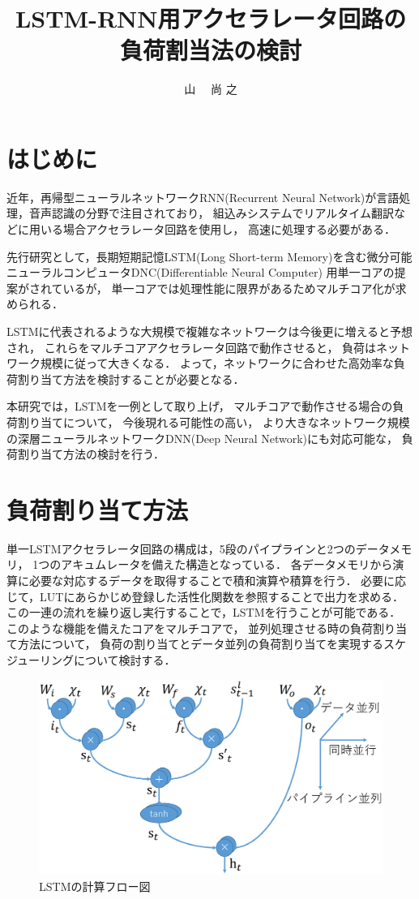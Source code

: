 \documentclass[a4j]{jarticle}
\title{LSTM-RNN用アクセラレータ回路の負荷割当法の検討}
\author{山 \UTF{FA11} ~~尚 之}
\begin{document}
\begin{Abstract}

 \section{はじめに}

近年，再帰型ニューラルネットワークRNN(Recurrent Neural Network)が言語処理，音声認識の分野で注目されており，
組込みシステムでリアルタイム翻訳などに用いる場合アクセラレータ回路を使用し，
高速に処理する必要がある．

先行研究として，長期短期記憶LSTM(Long Short-term Memory)を含む微分可能ニューラルコンピュータDNC(Differentiable Neural Computer)
用単一コアの提案\cite{bib:pre-method}がされているが，
単一コアでは処理性能に限界があるためマルチコア化が求められる．

LSTMに代表されるような大規模で複雑なネットワークは今後更に増えると予想され，
これらをマルチコアアクセラレータ回路で動作させると，
負荷はネットワーク規模に従って大きくなる．
よって，ネットワークに合わせた高効率な負荷割り当て方法を検討することが必要となる．

本研究では，LSTMを一例として取り上げ，
マルチコアで動作させる場合の負荷割り当てについて，
今後現れる可能性の高い，
より大きなネットワーク規模の深層ニューラルネットワークDNN(Deep Neural Network)にも対応可能な，
負荷割り当て方法の検討を行う．


 \section{負荷割り当て方法}
単一LSTMアクセラレータ回路の構成は，5段のパイプラインと2つのデータメモリ，
1つのアキュムレータを備えた構造となっている．
各データメモリから演算に必要な対応するデータを取得することで積和演算や積算を行う．
必要に応じて，LUTにあらかじめ登録した活性化関数を参照することで出力を求める．
この一連の流れを繰り返し実行することで，LSTMを行うことが可能である．
このような機能を備えたコアをマルチコアで，
並列処理させる時の負荷割り当て方法について，
負荷の割り当てとデータ並列の負荷割り当てを実現するスケジューリングについて検討する．
 \begin{figure}[h]
  \centering
  \includegraphics[scale=0.25]{flow.eps}
  \caption{LSTMの計算フロー図}
  \label{フロー図}
 \end{figure}


\end{Abstract}
\end{document}
